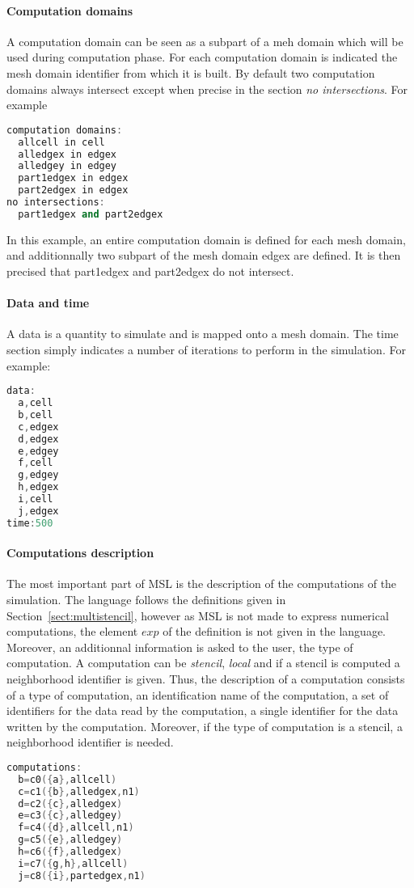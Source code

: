 \paragraph{Computation domains} A computation domain can be seen as a subpart of a meh domain which will be used during computation phase. For each computation domain is indicated the mesh domain identifier from which it is built. By default two computation domains always intersect except when precise in the section \emph{no intersections}. For example
\begin{lstlisting}[basicstyle=\small,mathescape,frame=single,language=C++]
computation domains:
  allcell in cell
  alledgex in edgex
  alledgey in edgey
  part1edgex in edgex
  part2edgex in edgex
no intersections:
  part1edgex and part2edgex
\end{lstlisting}
In this example, an entire computation domain is defined for each mesh domain, and additionnally two subpart of the mesh domain edgex are defined. It is then precised that part1edgex and part2edgex do not intersect.

\paragraph{Data and time} A data is a quantity to simulate and is mapped onto a mesh domain. The time section simply indicates a number of iterations to perform in the simulation. For example:
\begin{lstlisting}[basicstyle=\small,mathescape,frame=single,language=C++]
data:
  a,cell
  b,cell
  c,edgex
  d,edgex
  e,edgey
  f,cell
  g,edgey
  h,edgex
  i,cell
  j,edgex
time:500
\end{lstlisting}

\paragraph{Computations description} The most important part of MSL is the description of the computations of the simulation. The language follows the definitions given in Section~\ref{sect:multistencil}, however as MSL is not made to express numerical computations, the element $exp$ of the definition is not given in the language. Moreover, an additionnal information is asked to the user, the type of computation. A computation can be \emph{stencil}, \emph{local} and if a stencil is computed a neighborhood identifier is given.
Thus, the description of a computation consists of a type of computation, an identification name of the computation, a set of identifiers for the data read by the computation, a single identifier for the data written by the computation. Moreover, if the type of computation is a stencil, a neighborhood identifier is needed.
\begin{lstlisting}[basicstyle=\small,mathescape,frame=single,language=C++]
computations:
  b=c0({a},allcell)
  c=c1({b},alledgex,n1)
  d=c2({c},alledgex)
  e=c3({c},alledgey)
  f=c4({d},allcell,n1)
  g=c5({e},alledgey)
  h=c6({f},alledgex)
  i=c7({g,h},allcell)
  j=c8({i},partedgex,n1)
\end{lstlisting}

